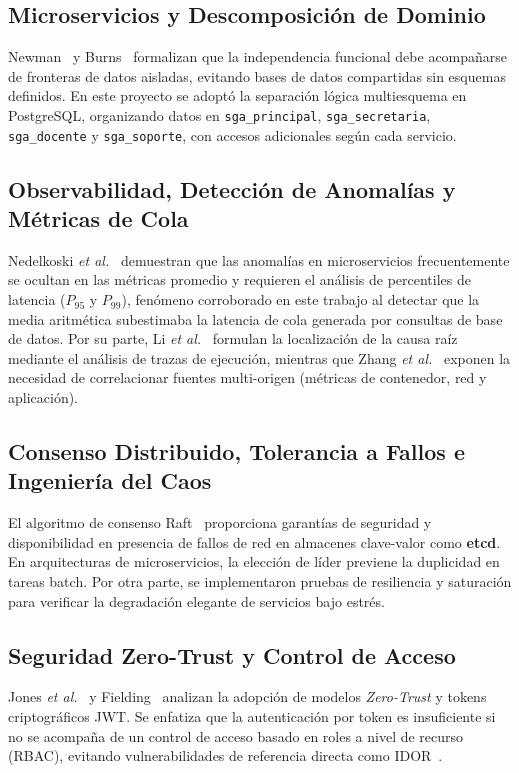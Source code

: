 \documentclass[11pt,a4paper]{article}
\begin{document}
\subsection{Microservicios y Descomposici\'on de Dominio}
Newman~\cite{newman2021microservices} y Burns~\cite{burns2025designing} formalizan que la independencia funcional debe acompa\~narse de fronteras de datos aisladas, evitando bases de datos compartidas sin esquemas definidos. En este proyecto se adopt\'o la separaci\'on l\'ogica multiesquema en PostgreSQL, organizando datos en \texttt{sga\_principal}, \texttt{sga\_secretaria}, \texttt{sga\_docente} y \texttt{sga\_soporte}, con accesos adicionales seg\'un cada servicio.

\subsection{Observabilidad, Detecci\'on de Anomal\'ias y M\'etricas de Cola}
Nedelkoski \textit{et al.}~\cite{nedelkoski2021anomaly} demuestran que las anomal\'ias en microservicios frecuentemente se ocultan en las m\'etricas promedio y requieren el an\'alisis de percentiles de latencia ($P_{95}$ y $P_{99}$), fen\'omeno corroborado en este trabajo al detectar que la media aritm\'etica subestimaba la latencia de cola generada por consultas de base de datos. Por su parte, Li \textit{et al.}~\cite{li2021fault} formulan la localizaci\'on de la causa ra\'iz mediante el an\'alisis de trazas de ejecuci\'on, mientras que Zhang \textit{et al.}~\cite{zhang2022microservice} exponen la necesidad de correlacionar fuentes multi-origen (m\'etricas de contenedor, red y aplicaci\'on).

\subsection{Consenso Distribuido, Tolerancia a Fallos e Ingenier\'ia del Caos}
El algoritmo de consenso Raft~\cite{ongaro2014raft} proporciona garant\'ias de seguridad y disponibilidad en presencia de fallos de red en almacenes clave-valor como \textbf{etcd}. En arquitecturas de microservicios, la elecci\'on de l\'ider previene la duplicidad en tareas batch. Por otra parte, se implementaron pruebas de resiliencia y saturaci\'on para verificar la degradaci\'on elegante de servicios bajo estr\'es.

\subsection{Seguridad Zero-Trust y Control de Acceso}
Jones \textit{et al.}~\cite{jones2015jwt} y Fielding~\cite{fielding2000architectural} analizan la adopci\'on de modelos \textit{Zero-Trust} y tokens criptogr\'aficos JWT. Se enfatiza que la autenticaci\'on por token es insuficiente si no se acompa\~na de un control de acceso basado en roles a nivel de recurso (RBAC), evitando vulnerabilidades de referencia directa como IDOR~\cite{provos1999bcrypt}.
\end{document}
